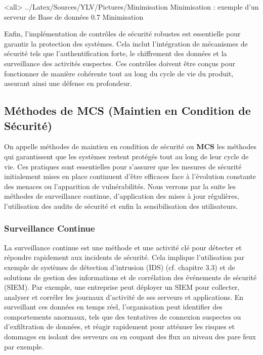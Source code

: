 \mode<all>{\picframe
{../Latex/Sources/YLV/Pictures/Minimisation}%
{Minimisation : exemple d'un serveur de Base de données} %
{0.7} %
{Minimisation} %
}

Enfin, l'implémentation de contrôles de sécurité robustes est essentielle pour garantir la protection des systèmes. Cela inclut l'intégration de mécanismes de sécurité tels que l'authentification forte, le chiffrement des données et la surveillance des activités suspectes. Ces contrôles doivent être conçus pour fonctionner de manière cohérente tout au long du cycle de vie du produit, assurant ainsi une défense en profondeur.

\subsection{Méthodes de MCS (Maintien en Condition de Sécurité)}

On appelle méthodes de maintien en condition de sécurité ou \textbf{MCS} les méthodes qui garantissent que les systèmes restent protégés tout au long de leur cycle de vie. Ces pratiques sont essentielles pour s'assurer que les mesures de sécurité initialement mises en place continuent d'être efficaces face à l'évolution constante des menaces ou l'apparition de vulnérabilités.
Nous verrons par la suite les méthodes de surveillance continue, d'application des mises à jour régulières, l'utilisation des audits de sécurité et enfin la sensibilisation des utilisateurs.

\subsubsection{Surveillance Continue}

La surveillance continue est une méthode et une activité clé pour détecter et répondre rapidement aux incidents de sécurité. Cela implique l'utilisation par exemple de systèmes de détection d'intrusion (IDS) (cf. chapitre 3.3) et de solutions de gestion des informations et de corrélation des événements de sécurité (SIEM). Par exemple, une entreprise peut déployer un SIEM pour collecter, analyser et corréler les journaux d'activité de ses serveurs et applications. En surveillant ces données en temps réel, l'organisation peut identifier des comportements anormaux, tels que des tentatives de connexion suspectes ou d'exfiltration de données, et réagir rapidement pour atténuer les risques et dommages en isolant des serveurs ou en coupant des flux au niveau des pare feux par exemple.


